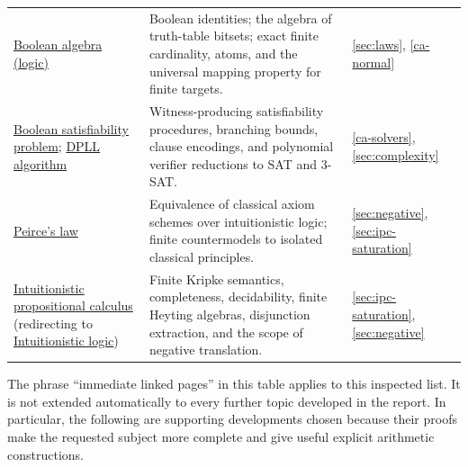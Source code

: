 \begin{longtable}{@{}>{\raggedright\arraybackslash}p{}>{\raggedright\arraybackslash}p{}>{\raggedright\arraybackslash}p{}@{}}
\href{https://en.wikipedia.org/wiki/Boolean_algebra_(logic)}{Boolean
algebra (logic)}
& Boolean identities; the algebra of truth-table bitsets; exact finite
cardinality, atoms, and the universal mapping property for finite targets.
& \ref{sec:laws}, \ref{ca-normal}\\[5pt]
\href{https://en.wikipedia.org/wiki/Boolean_satisfiability_problem}{Boolean
satisfiability problem};
\href{https://en.wikipedia.org/wiki/DPLL_algorithm}{DPLL algorithm}
& Witness-producing satisfiability procedures, branching bounds, clause
encodings, and polynomial verifier reductions to SAT and 3-SAT.
& \ref{ca-solvers}, \ref{sec:complexity}\\[5pt]
\href{https://en.wikipedia.org/wiki/Peirce's_law}{Peirce's law}
& Equivalence of classical axiom schemes over intuitionistic logic;
finite countermodels to isolated classical principles.
& \ref{sec:negative}, \ref{sec:ipc-saturation}\\[5pt]
\href{https://en.wikipedia.org/wiki/Intuitionistic_propositional_calculus}{Intuitionistic
propositional calculus} (redirecting to
\href{https://en.wikipedia.org/wiki/Intuitionistic_logic}{Intuitionistic logic})
& Finite Kripke semantics, completeness, decidability, finite Heyting
algebras, disjunction extraction, and the scope of negative translation.
& \ref{sec:ipc-saturation}, \ref{sec:negative}\\
\end{longtable}
\endgroup

The phrase ``immediate linked pages'' in this table applies to this inspected
list. It is not extended automatically to every further topic developed in
the report. In particular, the following are supporting developments chosen
because their proofs make the requested subject more complete and give
useful explicit arithmetic constructions.

